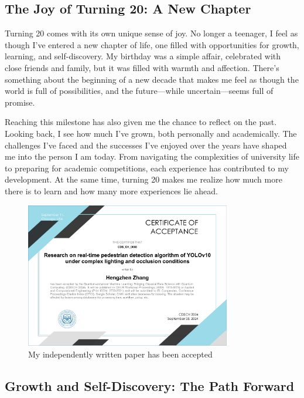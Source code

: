 \documentclass[a4paper]{article} 	%
\begin{document}
\subsection*{The Joy of Turning 20: A New Chapter}

Turning 20 comes with its own unique sense of joy. No longer a teenager, I feel as though I’ve entered a new chapter of life, one filled with opportunities for growth, learning, and self-discovery. My birthday was a simple affair, celebrated with close friends and family, but it was filled with warmth and affection. There’s something about the beginning of a new decade that makes me feel as though the world is full of possibilities, and the future—while uncertain—seems full of promise.

Reaching this milestone has also given me the chance to reflect on the past. Looking back, I see how much I’ve grown, both personally and academically. The challenges I’ve faced and the successes I’ve enjoyed over the years have shaped me into the person I am today. From navigating the complexities of university life to preparing for academic competitions, each experience has contributed to my development. At the same time, turning 20 makes me realize how much more there is to learn and how many more experiences lie ahead.

\begin{figure}[h!]
	\centering
	\includegraphics[width=0.8\textwidth]{fig0030.pdf}  %
	\caption{My independently written paper has been accepted}
	\label{fig:0030}
\end{figure}

\subsection*{Growth and Self-Discovery: The Path Forward}
\end{document}
